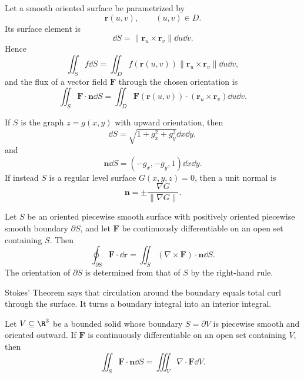     \begin{definition}
        Let a smooth oriented surface be parametrized by
        \[
            \mathbf{r}(u,v),
            \qquad
            (u,v)\in D.
        \]
        Its surface element is
        \[
            \dd S
            =
            \|\mathbf{r}_u\times\mathbf{r}_v\|\dd u\dd v.
        \]
        Hence
        \[
            \iint_S f\dd S
            =
            \iint_D
            f(\mathbf{r}(u,v))
            \|\mathbf{r}_u\times\mathbf{r}_v\|\dd u\dd v,
        \]
        and the flux of a vector field $\mathbf{F}$ through the chosen
        orientation is
        \[
            \iint_S\mathbf{F}\cdot\mathbf{n}\dd S
            =
            \iint_D
            \mathbf{F}(\mathbf{r}(u,v))
            \cdot
            (\mathbf{r}_u\times\mathbf{r}_v)\dd u\dd v.
        \]

        If $S$ is the graph $z=g(x,y)$ with upward orientation, then
        \[
            \dd S
            =
            \sqrt{1+g_x^2+g_y^2}\dd x\dd y,
        \]
        and
        \[
            \mathbf{n}\dd S
            =
            (-g_x,-g_y,1)\dd x\dd y.
        \]
        If instead $S$ is a regular level surface
        $G(x,y,z)=0$, then a unit normal is
        \[
            \mathbf{n}
            =
            \pm\frac{\nabla G}{\|\nabla G\|}.
        \]
    \end{definition}

    \begin{theorem}
        Let $S$ be an oriented piecewise smooth surface with positively oriented
        piecewise smooth boundary $\partial S$, and let $\mathbf{F}$ be
        continuously differentiable on an open set containing $S$. Then
        \[
            \oint_{\partial S}\mathbf{F}\cdot\dd\mathbf{r}
            =
            \iint_S(\nabla\times\mathbf{F})\cdot\mathbf{n}\dd S.
        \]
        The orientation of $\partial S$ is determined from that of $S$ by the
        right-hand rule.
    \end{theorem}

    \begin{idea}
        Stokes' Theorem says that circulation around the boundary equals total
        curl through the surface. It turns a boundary integral into an interior
        integral.
    \end{idea}

    \begin{theorem}
        Let $V\subseteq\R^3$ be a bounded solid whose boundary
        $S=\partial V$ is piecewise smooth and oriented outward. If
        $\mathbf{F}$ is continuously differentiable on an open set containing
        $V$, then
        \[
            \iint_S\mathbf{F}\cdot\mathbf{n}\dd S
            =
            \iiint_V\nabla\cdot\mathbf{F}\dd V.
        \]
    \end{theorem}

